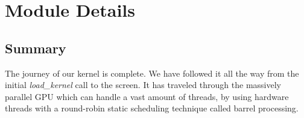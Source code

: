 \documentclass[../main/report.tex]{subfiles}
\begin{document}
\section{Module Details}













\subsection{Summary}
The journey of our kernel is complete.
We have followed it all the way from the initial \emph{load\_kernel} call to the screen.
It has traveled through the massively parallel GPU which can handle a vast amount of threads,
by using hardware threads with a round-robin static scheduling technique called barrel processing.
\end{document}
